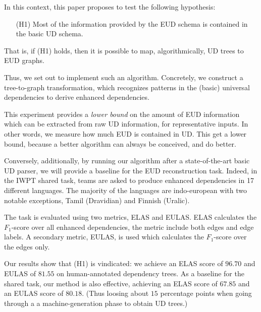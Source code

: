 \documentclass[11pt,a4paper]{article}
\begin{document}
In this context, this paper proposes to test the following hypothesis:
\begin{enumerate}
\item[(H1)] Most of the information provided by the EUD schema is
  contained in the basic UD schema.
\end{enumerate}

That is, if (H1) holds, then it is possible to map, algorithmically,
UD trees to EUD graphs.

Thus, we set out to implement such an algorithm. Concretely, we construct  a
tree-to-graph transformation, which recognizes patterns in the (basic)
universal dependencies to derive enhanced dependencies.
%

This experiment provides a \emph{lower bound} on the amount of EUD
information which can be extracted from raw UD information, for
representative inputs.  In other words, we measure how much EUD is
contained in UD. This get a lower bound, because a better algorithm
can always be conceived, and do better.


Conversely, additionally, by running our algorithm after a
state-of-the-art basic UD parser, we will provide a baseline for the
EUD reconstruction task.
%
%
Indeed, in the IWPT shared task, teams are asked to produce enhanced
dependencies in 17 different languages. The
majority of the languages are indo-european with two notable
exceptions, Tamil (Dravidian) and Finnish (Uralic).

The task is evaluated using two metrics, ELAS and EULAS. ELAS
calculates the $F_1$-score over all enhanced dependencies, the
metric include both edges and edge labels. A secondary metric,
EULAS, is used which calculates the $F_1$-score over the edges
only.


Our results show that (H1) is vindicated: we achieve an ELAS score of
$96.70$ and EULAS of $81.55$ on human-annotated dependency trees.  As
a baseline for the shared task, our method is also effective,
achieving an ELAS score of $67.85$ and an EULAS score of
$80.18$. (Thus loosing about $15$ percentage points when going through
a a machine-generation phase to obtain UD trees.)
\end{document}
